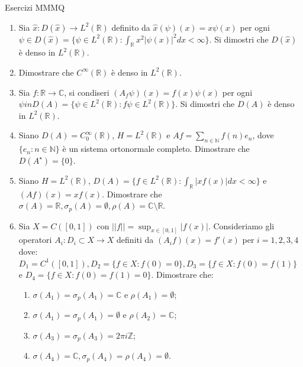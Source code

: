 \documentclass[]{book}
\theoremstyle{definition}
\begin{document}
\begin{center}
{\Large Esercizi MMMQ}\\
\end{center}

\vspace{0.2 cm}




\begin{enumerate}
\item Sia $\hat{x}: D(\hat{x}) \to L^2(\mathbb{R})$ definito da $\hat{x}(\psi)(x) = x \psi (x)$ per ogni $\psi \in D(\hat{x}) = \{\psi \in L^2(\mathbb{R}): \int_{\mathbb{R}}x^2|\psi(x)|^2dx < \infty\}$. Si dimostri che $D(\hat{x})$ è denso in $L^2(\mathbb{R})$.

\item Dimostrare che $C^\infty(\mathbb{R})$ è denso in $L^2(\mathbb{R})$.

\item Sia $f: \mathbb{R} \to \mathbb{C}$, si condiseri $(A_f \psi)(x) = f(x)\psi(x)$ per ogni $\psi in D(A) = \{\psi \in L^2(\mathbb{R}): f \psi \in L^2(\mathbb{R})\}$. Si dimostri che $D(A)$ è denso in $L^2(\mathbb{R})$.

\item Siano $D(A) = C^{\infty}_0(\mathbb{R})$, $H = L^2(\mathbb{R})$ e $Af = \sum_{n \in \mathbb{N}}f(n)e_n$, dove $\{e_n: n \in \mathbb{N}\}$ è un sistema ortonormale completo. Dimostrare che $D(A^\star) = \{0\}$.

\item Siano $H = L^2(\mathbb{R})$, $D(A) = \{f \in L^2(\mathbb{R}): \int_\mathbb{R} |xf(x)|dx < \infty\}$ e $(Af)(x) = xf(x)$. Dimostrare che $\sigma(A) = \mathbb{R}, \sigma_p(A) = \emptyset, \rho(A) = \mathbb{C}\setminus \mathbb{R}$.

\item Sia $X = C([0, 1])$ con $||f|| = \sup_{x \in [0, 1]}|f(x)|$. Consideriamo gli operatori $A_i : D_i \subset X \to X$ definiti da $(A_i f)(x) = f'(x)$ per $i = 1, 2, 3, 4$ dove: $D_1 = C^1([0, 1]), D_2 = \{f \in X: f(0) = 0\}, D_3 = \{f \in X: f(0) = f(1)\}$ e $D_4 = \{f \in X: f(0) = f(1) = 0\}$.
Dimostrare che:
\begin{enumerate}
    \item $\sigma(A_1) = \sigma_p(A_1) = \mathbb{C}$ e $\rho(A_1) = \emptyset$;
    \item $\sigma(A_1) = \sigma_p(A_1) = \emptyset$ e $\rho(A_2) = \mathbb{C}$;
    \item $\sigma(A_3) = \sigma_p(A_3) = 2\pi i \mathbb{Z}$;
    \item $\sigma(A_4) = \mathbb{C}, \sigma_p(A_4) = \rho(A_4) = \emptyset.$
\end{enumerate}


\end{enumerate}
\end{document}
